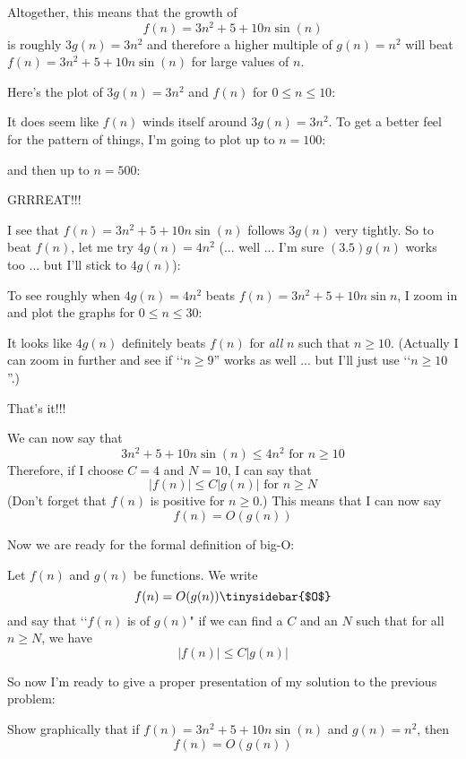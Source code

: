 Altogether, this means that the growth of 
\[
f(n) = 3n^2 + 5 + 10 n \sin (n)
\]
is roughly $3g(n) = 3n^2$
and therefore a higher multiple of $g(n) = n^2$ will beat
$f(n) = 3n^2 + 5 + 10 n \sin (n)$ for large values of $n$.

Here's the plot of $3g(n) = 3n^2$ and $f(n)$ for $0 \leq n \leq 10$:

It does seem like $f(n)$ winds itself around $3g(n) = 3n^2$.
To get a better feel for the pattern of things, I'm going 
to plot up to $n = 100$:

and then up to $n = 500$:


GRRREAT!!!

I see that 
$f(n) = 3n^2 + 5 + 10 n \sin (n)$
follows $3g(n)$ very tightly.
So to beat $f(n)$, let me try $4g(n) = 4n^2$
(... well ... I'm sure $(3.5)g(n)$ works too ... but I'll stick to $4g(n)$):


To see roughly when $4g(n) = 4n^2$ beats 
$f(n) = 3n^2 + 5 + 10n  \sin n$, I zoom in and plot 
the graphs for $0 \leq n \leq 30$:

It looks like $4g(n)$ definitely beats $f(n)$ for \textit{all} $n$
such that $n \geq 10$.
(Actually I can zoom in further and see if \lq\lq $n \geq 9$''
works as well ... but I'll just use \lq\lq $n \geq 10$''.)

That's it!!!

We can now say that 
\[
3n^2 + 5 + 10 n \sin (n) \leq 4n^2 \text{ for $n \geq 10$}
\]
Therefore, if I choose $C = 4$ and $N = 10$, I can say that
\[
|f(n)| \leq C |g(n)| \text{ for $n \geq N$}
\]
(Don't forget that $f(n)$ is positive for $n \geq 0$.)
This means that I can now say
\[
f(n) = O(g(n))
\]

Now we are ready for the formal definition of big-O:

\begin{defn}
Let $f(n)$ and $g(n)$ be functions.
We write 
\[
f(n) = O(g(n)) \tinysidebar{$O$}
\]
and say that 
\lq\lq $f(n)$ is  of $g(n)$"
if we can find a $C$ and an $N$ such that 
for all $n \geq N$, we have
\[
|f(n)| \leq C|g(n)|
\]
\end{defn}

So now I'm ready to give a proper presentation of my solution to
the previous problem:

\newpage
\begin{eg}
Show graphically that if 
$f(n) = 3n^2 + 5 + 10 n \sin (n)$
and $g(n) = n^2$, then
\[
f(n) = O(g(n))
\]
\end{eg}

